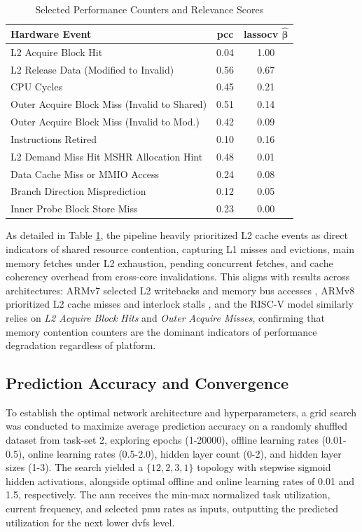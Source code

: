 \documentclass[journal]{IEEEtran}
\begin{document}
\begin{table}[htb]
    \caption{Selected Performance Counters and Relevance Scores}
    \label{tab:selected_features}
    \centering
    \footnotesize
    \begin{tabular}{|lcc|}
        \hline
        \textbf{Hardware Event} & \textbf{\gls{pcc}} & \textbf{\gls{lassocv} $\boldsymbol{\widehat{\beta}}$} \\ \hline
        L2 Acquire Block Hit & 0.04 & 1.00 \\
        L2 Release Data (Modified to Invalid) & 0.56 & 0.67 \\
        CPU Cycles & 0.45 & 0.21 \\
        Outer Acquire Block Miss (Invalid to Shared) & 0.51 & 0.14 \\
        Outer Acquire Block Miss (Invalid to Mod.) & 0.42 & 0.09 \\
        Instructions Retired & 0.10 & 0.16 \\
        L2 Demand Miss Hit MSHR Allocation Hint & 0.48 & 0.01 \\
        Data Cache Miss or MMIO Access & 0.24 & 0.08 \\
        Branch Direction Misprediction & 0.12 & 0.05 \\
        Inner Probe Block Store Miss & 0.23 & 0.00 \\ \hline
    \end{tabular}
\end{table}

As detailed in Table \ref{tab:selected_features}, the pipeline heavily prioritized L2 cache events as direct indicators of shared resource contention, capturing L1 misses and evictions, main memory fetches under L2 exhaustion, pending concurrent fetches, and cache coherency overhead from cross-core invalidations. This aligns with results across architectures: ARMv7 selected L2 writebacks and memory bus accesses \cite{hoffmann2021online}, ARMv8 prioritized L2 cache misses and interlock stalls \cite{hoffmann2024lightweight}, and the RISC-V model similarly relies on \textit{L2 Acquire Block Hits} and \textit{Outer Acquire Misses}, confirming that memory contention counters are the dominant indicators of performance degradation regardless of platform.

\subsection{Prediction Accuracy and Convergence}

To establish the optimal network architecture and hyperparameters, a grid search was conducted to maximize average prediction accuracy on a randomly shuffled dataset from task-set 2, exploring epochs (1-20000), offline learning rates (0.01-0.5), online learning rates (0.5-2.0), hidden layer count (0-2), and hidden layer sizes (1-3). The search yielded a $\{12, 2, 3, 1\}$ topology with stepwise sigmoid hidden activations, alongside optimal offline and online learning rates of 0.01 and 1.5, respectively. The \gls{ann} receives the min-max normalized task utilization, current frequency, and selected \gls{pmu} rates as inputs, outputting the predicted utilization for the next lower \gls{dvfs} level.
\end{document}
